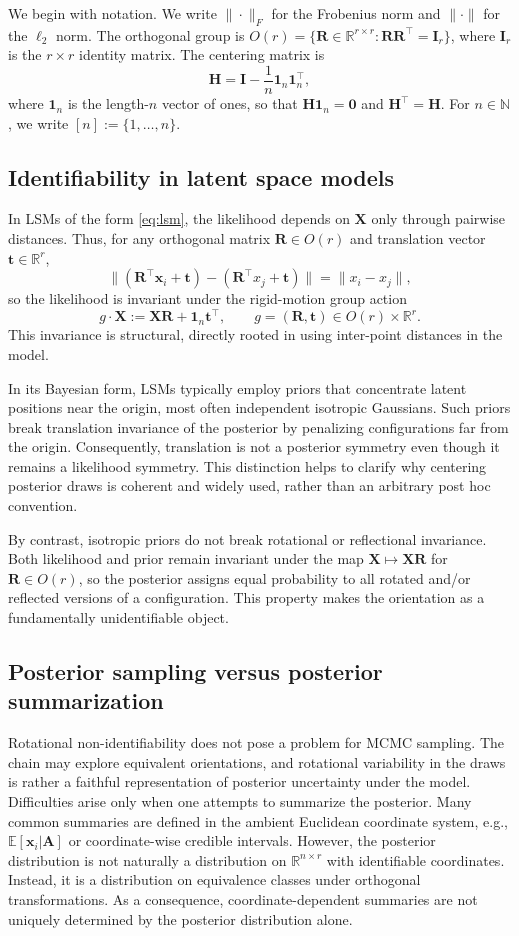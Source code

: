 \documentclass[12pt]{article}
\newcommand{\bbR}{\mathbb{R}}
\newcommand{\bbE}{\mathbb{E}}
\newcommand{\bbN}{\mathbb{N}}
\newcommand{\bfA}{\boldsymbol{A}}
\newcommand{\bfH}{\boldsymbol{H}}
\newcommand{\bfI}{\boldsymbol{I}}
\newcommand{\bfR}{\boldsymbol{R}}
\newcommand{\bfX}{\boldsymbol{X}}
\newcommand{\bfx}{\boldsymbol{x}}
\newcommand{\bfone}{\boldsymbol{1}}
\newcommand{\bfzero}{\boldsymbol{0}}
\newcommand{\bft}{\boldsymbol{t}}
\begin{document}
We begin with notation. We write $\|\cdot\|_F$ for the Frobenius norm and $\|\cdot\|$ for the $\ell_2$ norm. The orthogonal group is
$O(r)=\{\bfR\in\bbR^{r\times r}:\bfR\bfR^\top=\bfI_r\}$, where $\bfI_r$ is the $r\times r$
identity matrix. The centering matrix is
\[
\bfH = \bfI - \frac{1}{n}\bfone_n\bfone_n^\top,
\]
where $\bfone_n$ is the length-$n$ vector of ones, so that $\bfH\bfone_n=\bfzero$ and
$\bfH^\top=\bfH$. For $n\in\bbN$, we write $[n]:=\{1,\ldots,n\}$.


\subsection{Identifiability in latent space models}

In LSMs of the form \eqref{eq:lsm}, the likelihood depends on $\bfX$ only through pairwise distances.
Thus, for any orthogonal matrix $\bfR\in O(r)$ and translation vector $\bft\in\bbR^r$,
\[
\| (\bfR^\top \bfx_i + \bft) - (\bfR^\top x_j + \bft) \| = \|x_i - x_j\|,
\]
so the likelihood is invariant under the rigid-motion group action
\[
g\cdot \bfX := \bfX\bfR + \bfone_n \bft^\top,\qquad g=(\bfR,\bft)\in O(r)\times\bbR^r.
\]
This invariance is structural, directly rooted in using inter-point distances in the model.

In its Bayesian form, LSMs typically employ priors that concentrate latent positions near the origin, most often
independent isotropic Gaussians. Such priors break translation invariance of the posterior by penalizing configurations far from the origin. Consequently, translation is not a posterior symmetry even though it remains a likelihood symmetry. This distinction helps to clarify why centering posterior
draws is coherent and widely used, rather than an arbitrary post hoc convention.

By contrast, isotropic priors do not break rotational or reflectional invariance. Both likelihood and
prior remain invariant under the map $\bfX\mapsto \bfX\bfR$ for $\bfR\in O(r)$, so the posterior assigns equal probability
to all rotated and/or reflected versions of a configuration. This property makes the orientation as a fundamentally unidentifiable object.

\subsection{Posterior sampling versus posterior summarization}

Rotational non-identifiability does not pose a problem for MCMC sampling. The chain may explore
equivalent orientations, and rotational variability in the draws is rather a faithful representation of
posterior uncertainty under the model. Difficulties arise only when one attempts to summarize the posterior. Many common summaries are defined in the ambient Euclidean coordinate system, e.g., $\bbE[\bfx_i\vert \bfA]$ or coordinate-wise
credible intervals. However, the posterior distribution is not naturally a distribution on
$\bbR^{n\times r}$ with identifiable coordinates. Instead, it is a distribution on equivalence classes
under orthogonal transformations. As a consequence, coordinate-dependent summaries are not uniquely
determined by the posterior distribution alone.
\end{document}
